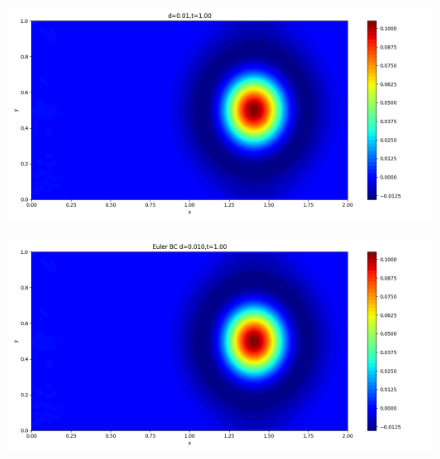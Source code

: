 \documentclass[12pt]{article}
\begin{document}
\begin{figure}[H]
\begin{minipage}{\linewidth}
\begin{minipage}{0.5\textwidth}
\includegraphics[width=\linewidth]{figures/3d0.01t1.00.png}
\label{fig5}
\end{minipage}\hfill
\begin{minipage}{0.5\textwidth}
\includegraphics[width=\linewidth]{figures/3Ed0.010t1.00.png}
\label{fig6}
\end{minipage}
\vspace{-1.5em}


\end{minipage}
\end{figure}
\end{document}
